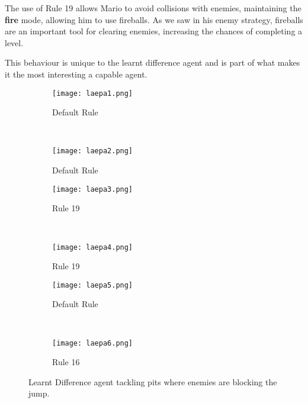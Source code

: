 The use of Rule 19 allows Mario to avoid collisions with enemies, maintaining the \textbf{fire} mode, allowing him to use fireballs. As we saw in his enemy strategy, fireballs are an important tool for clearing enemies, increasing the chances of completing a level.

This behaviour is unique to the learnt difference agent and is part of what makes it the most interesting a capable agent. 


\clearpage

\begin{figure}[t]
	\begin{adjustwidth}{-2cm}{-2cm}
    \centering
          \begin{subfigure}[b]{0.49\textwidth}
                  \centering
                  \texttt{[image: laepa1.png]}
                  \caption{Default Rule}
                  \vspace*{\baselineskip}
          \end{subfigure}~
          \begin{subfigure}[b]{0.49\textwidth}
                  \centering
                  \texttt{[image: laepa2.png]}
                  \caption{Default Rule}
                  \vspace*{\baselineskip}
          \end{subfigure}
          \begin{subfigure}[b]{0.49\textwidth}
                  \centering
                  \texttt{[image: laepa3.png]}
                  \caption{Rule 19}
                  \vspace*{\baselineskip}
          \end{subfigure}~
          \begin{subfigure}[b]{0.49\textwidth}
                  \centering
                  \texttt{[image: laepa4.png]}
                  \caption{Rule 19}
                  \vspace*{\baselineskip}
          \end{subfigure}
          \begin{subfigure}[b]{0.49\textwidth}
                  \centering
                  \texttt{[image: laepa5.png]}
                  \caption{Default Rule}
                  \vspace*{\baselineskip}
          \end{subfigure}~
          \begin{subfigure}[b]{0.49\textwidth}
                  \centering
                  \texttt{[image: laepa6.png]}
                  \caption{Rule 16}
                  \vspace*{\baselineskip}
          \end{subfigure}
    \caption{Learnt Difference agent tackling pits where enemies are blocking the jump.}\label{fig:laepa}
    \end{adjustwidth}
\end{figure}


